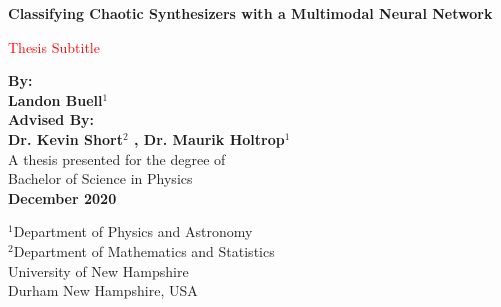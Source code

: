 \documentclass[12pt,letterpaper]{article}
\begin{document}

\begin{titlepage}
	\begin{center}
   		\vspace*{1cm}
       	\begin{LARGE}
       	\textbf{Classifying Chaotic Synthesizers with a Multimodal Neural Network} \\
       	\end{LARGE}
       	\vspace{1cm}
       	\begin{Large}
       	\textcolor{red}{Thesis Subtitle}
       	\end{Large}             
       	\vspace{1.5cm}

       	\textbf{By: \\ Landon Buell$^1$} \\       
       	\vspace{0.5cm}
       	\textbf{Advised By: \\ Dr. Kevin Short$^2$ , Dr. Maurik Holtrop$^1$} \\
      	\vspace{1cm}
      	A thesis presented for the degree of\\
       	Bachelor of Science in Physics \\
       	\vspace{0.5cm}
       	\textbf{December 2020}
        \vspace{1cm}

       	\vfill
      
       	\vspace{1cm}              
       	$^1$Department of Physics and Astronomy\\           
       	$^2$Department of Mathematics and Statistics\\
       	\vspace{0.5cm}  
       	University of New Hampshire\\
       	Durham New Hampshire, USA\\            
   \end{center}
\end{titlepage}

\tableofcontents

\newpage
\end{document}
